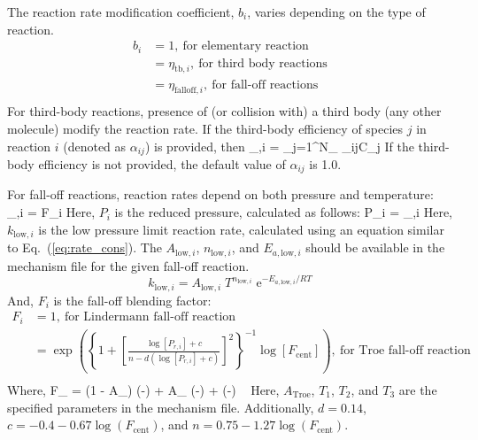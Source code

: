 The reaction rate modification coefficient, $b_i$, varies depending on the type of reaction.
\begin{equation}\label{eq:reac_mod_coeff}
\begin{aligned}
b_i &= 1, \ \text{for elementary reaction} \\
    &= \eta_{\mathrm{tb},i}, \ \text{for third body reactions} \\
    &= \eta_{\mathrm{falloff},i}, \ \text{for fall-off reactions} \\
\end{aligned}
\end{equation}
For third-body reactions, presence of (or collision with) a third body (any other molecule) modify the reaction rate. If the third-body efficiency of species $j$ in reaction $i$ (denoted as $\alpha_{ij}$) is provided, then
\be
\eta_{,i} = \sum_{j=1}^{N_{}} \alpha_{ij}C_{j}
\ee
If the third-body efficiency is not provided, the default value of $\alpha_{ij}$ is 1.0.

For fall-off reactions, reaction rates depend on both pressure and temperature:
\be
\eta_{,i} =   F_i
\ee
Here, $P_i$ is the reduced pressure, calculated as follows:
\be
P_{i} =   \eta_{,i}
\ee
Here, $k_{\mathrm{low},i}$ is the low pressure limit reaction rate, calculated using an equation similar to Eq.~(\ref{eq:rate_cons}). The $A_{\mathrm{low},i}$, $n_{\mathrm{low},i}$, and $E_{a,\mathrm{low},i}$ should be available in the mechanism file for the given fall-off reaction.
\begin{equation}\label{eq:low_rate_cons}
k_{\mathrm{low},i} = A_{\mathrm{low},i}\;T^{n_{\mathrm{low},i}}\;\mathrm{e}^{-E_{a,\mathrm{low},i}/RT}
\end{equation}
And, $F_i$ is the fall-off blending factor:
\begin{equation}\label{eq:falloff_Fi}
\begin{aligned}
F_i &= 1, \ \text{for Lindermann fall-off reaction} \\
    &= \exp\left( {\left\{1+ {\left[\frac{\log[P_{r,i}] + c}{n-d(\log[P_{r,i}] + c)} \right]}^2 \right\}^{-1} {\log[F_{\mathrm{cent}}] }} \right) , \ \text{for Troe fall-off reaction} \\
\end{aligned}
\end{equation}
Where, 
\be
F_{} = (1 - A_{}) \exp\left(-\right) + A_{} \exp\left(-\right) + \exp\left(-\right) \
\ee
Here, $A_{\mathrm{Troe}}$, $T_1$, $T_2$, and $T_3$ are the specified parameters in the mechanism file. Additionally, $d=0.14$, $c=-0.4 - 0.67 \log(F_{\mathrm{cent}})$, and $n=0.75 - 1.27\log(F_{\mathrm{cent}})$.

